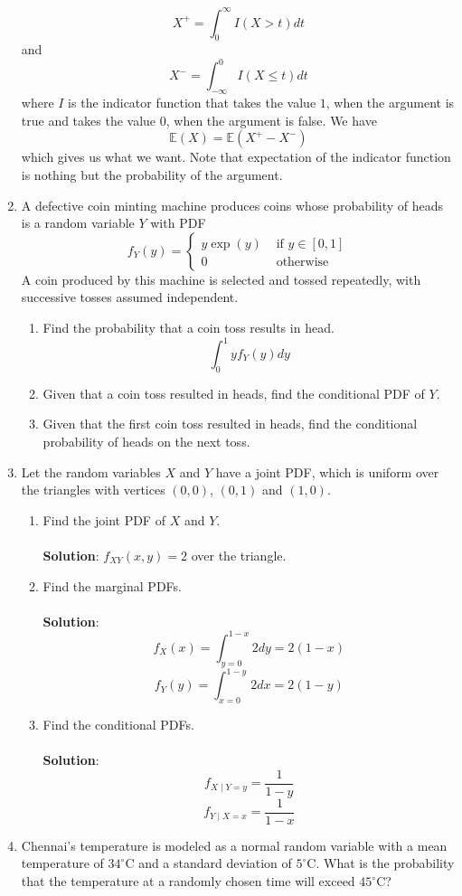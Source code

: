 \documentclass{article}
\newcommand{\dint}{\displaystyle\int}
\newcommand{\Eb}{\mathbb{E}}
\newcommand{\soln}[1]{\\ \textbf{Solution}: #1}
\newcommand{\bkt}[1]{\left(#1\right)}
\begin{document}
\begin{enumerate}
{		$$X^+ = \dint_0^{\infty} I\bkt{X > t}dt$$
		and
		$$X^- = \dint_{-\infty}^0 I\bkt{X \leq t}dt$$
		where $I$ is the indicator function that takes the value $1$, when the argument is true and takes the value $0$, when the argument is false. We have
		$$\Eb\bkt{X} = \Eb\bkt{X^+-X^-}$$
		which gives us what we want. Note that expectation of the indicator function is nothing but the probability of the argument.
		}
		\item
		A defective coin minting machine produces coins whose probability of heads is a random variable $Y$ with PDF
		$$f_Y\bkt{y} = \begin{cases}
		y \exp\bkt{y} & \text{ if }y \in [0,1]\\
		0 & \text{ otherwise}
		\end{cases}$$
		A coin produced by this machine is selected and tossed repeatedly, with successive tosses assumed independent.
		\begin{enumerate}
			\item
			Find the probability that a coin toss results in head.\\
			$$\dint_0^1 y f_Y(y)dy$$
			\item
			Given that a coin toss resulted in heads, find the conditional PDF of $Y$.\\
			$$ $$
			\item
			Given that the first coin toss resulted in heads, find the conditional probability of heads on the next toss.
		\end{enumerate}
		\item
		Let the random variables $X$ and $Y$ have a joint PDF, which is uniform over the triangles with vertices $(0,0)$, $(0,1)$ and $(1,0)$.
		\begin{enumerate}
			\item
			Find the joint PDF of $X$ and $Y$.\\
			\soln{
			$f_{XY}(x,y) = 2$ over the triangle.
			}
			\item
			Find the marginal PDFs.\\
			\soln{
			$$f_X(x) = \dint_{y=0}^{1-x} 2dy = 2\bkt{1-x}$$
			$$f_Y(y) = \dint_{x=0}^{1-y} 2dx = 2\bkt{1-y}$$			
			}
			\item
			Find the conditional PDFs.\\
			\soln{
			$$f_{X \mid Y=y} = \dfrac1{1-y}$$
			$$f_{Y \mid X=x} = \dfrac1{1-x}$$
			}
		\end{enumerate}
		\item
		Chennai's temperature is modeled as a normal random variable with a mean temperature of $34^{\circ}$C and a standard deviation of $5^{\circ}$C. What is the probability that the temperature at a randomly chosen time will exceed $45^{\circ}$C?\\

\end{enumerate}
\end{document}
